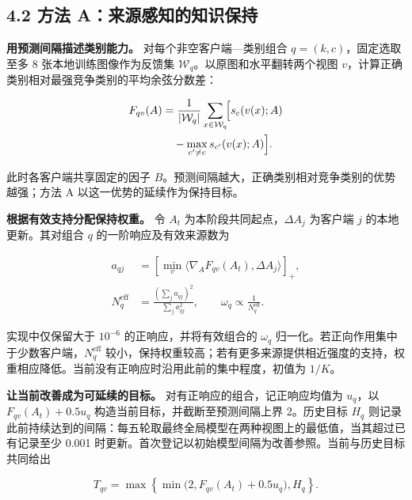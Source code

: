 \documentclass[10pt,twocolumn,letterpaper]{article}
\begin{document}
\subsection*{4.2 方法 A：来源感知的知识保持}

\textbf{用预测间隔描述类别能力。} 对每个非空客户端—类别组合 $q=(k,c)$，固定选取至多 8 张本地训练图像作为反馈集 $\mathcal W_q$。以原图和水平翻转两个视图 $v$，计算正确类别相对最强竞争类别的平均余弦分数差：


\begin{equation}\begin{aligned}F_{qv}(A)&=\frac{1}{|\mathcal W_q|}\sum_{x\in\mathcal W_q}
\!\Bigl[s_c(v(x);A)\\ &\quad-\max_{c'\ne c}s_{c'}(v(x);A)\Bigr].\end{aligned}\end{equation}

此时各客户端共享固定的因子 $B$。预测间隔越大，正确类别相对竞争类别的优势越强；方法 A 以这一优势的延续作为保持目标。


\textbf{根据有效支持分配保持权重。} 令 $A_t$ 为本阶段共同起点，$\Delta A_j$ 为客户端 $j$ 的本地更新。其对组合 $q$ 的一阶响应及有效来源数为


\begin{equation}\begin{aligned}
a_{qj}&=\left[\min_v\langle\nabla_A F_{qv}(A_t),\Delta A_j\rangle\right]_+,\\
N_q^{\mathrm{eff}}&=\frac{(\sum_j a_{qj})^2}{\sum_j a_{qj}^2},\qquad
\omega_q\propto\frac{1}{N_q^{\mathrm{eff}}}.
\end{aligned}\end{equation}

实现中仅保留大于 $10^{-6}$ 的正响应，并将有效组合的 $\omega_q$ 归一化。若正向作用集中于少数客户端，$N_q^{\mathrm{eff}}$ 较小，保持权重较高；若有更多来源提供相近强度的支持，权重相应降低。当前没有正响应时沿用此前的集中程度，初值为 $1/K$。


\textbf{让当前改善成为可延续的目标。} 对有正响应的组合，记正响应均值为 $u_q$，以 $F_{qv}(A_t)+0.5u_q$ 构造当前目标，并截断至预测间隔上界 2。历史目标 $H_q$ 则记录此前持续达到的间隔：每五轮取最终全局模型在两种视图上的最低值，当其超过已有记录至少 0.001 时更新。首次登记以初始模型间隔为改善参照。当前与历史目标共同给出


\begin{equation}T_{qv}=\max\left\{\min\bigl(2,F_{qv}(A_t)+0.5u_q\bigr),H_q\right\}.\end{equation}
\end{document}

